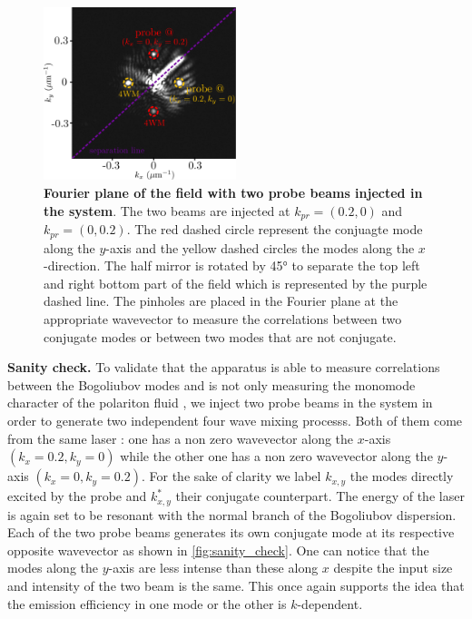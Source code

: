 \begin{figure}
    \centering
    \includegraphics[width=0.5\textwidth]{chap_correlation/fig/mosaic_4wm.pdf}
    \caption{\textbf{Fourier plane of the field with two probe beams injected in the system}. The two beams are injected at $k_{pr}=(0.2,0)$ and $k_{pr}=(0,0.2)$. The red dashed circle represent the conjuagte mode along the $y$-axis and the yellow dashed circles the modes along the $x$-direction. The half mirror is rotated by 45° to separate the top left and right bottom part of the field
    which is represented by the purple dashed line. The pinholes are placed in the Fourier plane at the appropriate wavevector to measure the correlations between two conjugate modes or between two modes that are not conjugate.}
    \label{fig:sanity_check}
\end{figure}

\bigskip

\indent \textbf{Sanity check.} To validate that the apparatus is able to measure correlations between the Bogoliubov modes and is not only measuring the monomode character of the polariton fluid \cite{a_baas_quantum_degeneracy2006}, we inject two probe beams in the system in order to generate two independent 
four wave mixing processs. Both of them come from the same laser : one has a non zero wavevector along the $x$-axis $(k_x=0.2, k_y=0)$ while the other one has a non zero wavevector along the $y$-axis $(k_x=0, k_y=0.2)$. For the sake of clarity we label $k_{x,y}$ the modes directly excited by the probe and $k_{x,y}^*$ their conjugate counterpart. The energy of the laser is again set to be resonant with the normal branch of the Bogoliubov dispersion.
Each of the two probe beams generates its own conjugate mode at its respective opposite wavevector as shown in \autoref{fig:sanity_check}. 
One can notice that the modes along the $y$-axis are less intense than these along $x$ despite the input size and intensity of the two beam is the same. This once again supports the idea that the emission efficiency in one mode or the other is $k$-dependent. 

